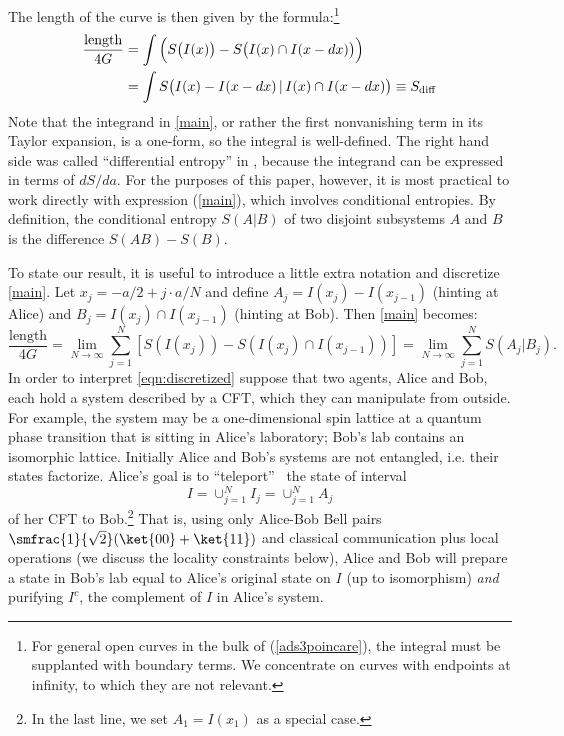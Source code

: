 \documentclass[12pt]{article}
\def\sdiff{S_{\rm diff}}
\begin{document}
The length of the curve is then given by the formula:\footnote{For general open curves in the bulk of (\ref{ads3poincare}), the integral must be supplanted with boundary terms. We concentrate on curves with endpoints at infinity, to which they are not relevant.}
\begin{align}
\frac{\rm length}{4G} & = \int \Big(S\big(I(x)\big) - S\big(I(x) \cap I(x-dx)\big) \Big)
\nonumber \\ & =
\int S\big( I(x) - I(x-dx)\, |\,  I(x) \cap I(x-dx) \big) \equiv \sdiff
\label{main}
\end{align}
Note that the integrand in \eqref{main}, or rather the first nonvanishing term in its Taylor expansion, is a one-form, so the integral is well-defined. The right hand side was called ``differential entropy'' in \cite{holeography}, because the integrand can be expressed in terms of $dS/da$. For the purposes of this paper, however, it is most practical to work directly with expression (\ref{main}), which involves conditional entropies. By definition, the conditional entropy $S(A|B)$ of two disjoint subsystems $A$ and $B$ is the difference $S(AB)-S(B)$.


To state our result, it is useful to introduce a little extra notation and discretize \eqref{main}. Let $x_j = -a/2 + j \cdot a/N$ and define $A_j = I(x_j ) - I(x_{j-1})$ (hinting at Alice) and $B_j = I(x_j) \cap I(x_{j-1})$ (hinting at Bob). Then \eqref{main} becomes:
\begin{equation}
\frac{\text{length}}{4G}= \lim_{N \rightarrow \infty} \sum_{j=1}^N
	\left[ S \left(I(x_j) \right) - S\left( I(x_j) \cap I(x_{j-1} ) \right) \right]
= \lim_{N \rightarrow \infty} \sum_{j=1}^N
	S( A_j | B_j ). \label{eqn:discretized}
\end{equation}
In order to interpret \eqref{eqn:discretized} suppose that two agents, Alice and Bob, each hold a system described by a CFT, which they can manipulate from outside. For example, the system may be a one-dimensional spin lattice at a quantum phase transition that is sitting in Alice's laboratory; Bob's lab contains an isomorphic lattice. Initially Alice and Bob's systems are not entangled, i.e. their states factorize. Alice's goal is to ``teleport''~\cite{teleport} the state of interval
\begin{equation}
I = \cup_{j=1}^N I_j = \cup_{j=1}^N A_j
\end{equation}
of her CFT to Bob.\footnote{In the last line, we set $A_1 = I(x_1)$ as a special case.} That is, using only Alice-Bob Bell pairs $\smfrac{1}{\sqrt{2}}( \ket{00} + \ket{11} )$ and classical communication plus local operations (we discuss the locality constraints below), Alice and Bob will prepare a state in Bob's lab equal to Alice's original state on $I$ (up to isomorphism) \emph{and} purifying $I^c$, the complement of $I$ in Alice's system.
\end{document}
